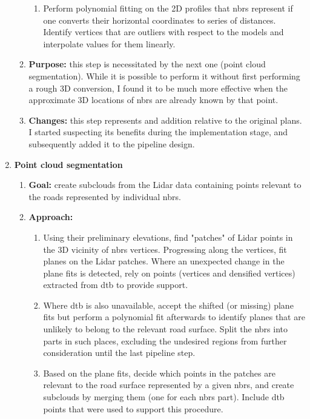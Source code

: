 \begin{enumerate}
\begin{enumerate}
\begin{enumerate}
            \item Perform polynomial fitting on the 2D profiles that \ac{nbrs} represent if one converts their horizontal coordinates to series of distances. Identify vertices that are outliers with respect to the models and interpolate values for them linearly.
        \end{enumerate}
        \item \textbf{Purpose:} this step is necessitated by the next one (point cloud segmentation). While it is possible to perform it without first performing a rough 3D conversion, I found it to be much more effective when the approximate 3D locations of \ac{nbrs} are already known by that point.
        \item \textbf{Changes:} this step represents and addition relative to the original plans. I started suspecting its benefits during the implementation stage, and subsequently added it to the pipeline design.
    \end{enumerate}
    \item \textbf{Point cloud segmentation}
    \begin{enumerate}
        \item \textbf{Goal:} create subclouds from the Lidar data containing points relevant to the roads represented by individual \ac{nbrs}.
        \item \textbf{Approach:}
        \begin{enumerate}
            \item Using their preliminary elevations, find "patches" of Lidar points in the 3D vicinity of \ac{nbrs} vertices. Progressing along the vertices, fit planes on the Lidar patches. Where an unexpected change in the plane fits is detected, rely on points (vertices and densified vertices) extracted from \ac{dtb} to provide support.
            \item Where \ac{dtb} is also unavailable, accept the shifted (or missing) plane fits but perform a polynomial fit afterwards to identify planes that are unlikely to belong to the relevant road surface. Split the \ac{nbrs} into parts in such places, excluding the undesired regions from further consideration until the last pipeline step. 
            \item Based on the plane fits, decide which points in the patches are relevant to the road surface represented by a given \ac{nbrs}, and create subclouds by merging them (one for each \ac{nbrs} part). Include \ac{dtb} points that were used to support this procedure.
        \end{enumerate}

\end{enumerate}
\end{enumerate}
